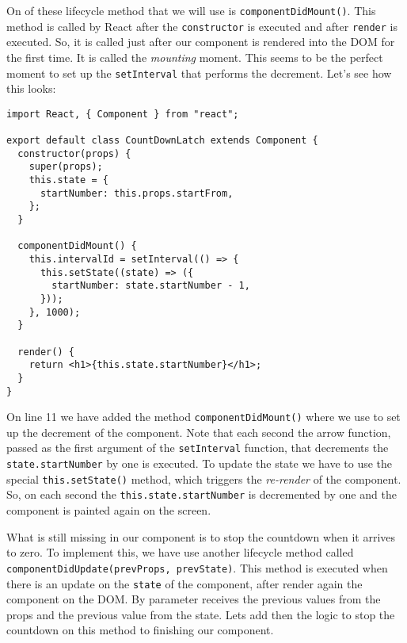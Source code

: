 \documentclass[a4paper, oneside, titlepage, 12pt]{book}
\begin{document}
On of these lifecycle method that we will use is \texttt{componentDidMount()}. This method is called by React after the \texttt{constructor} is executed and after \texttt{render} is executed. So, it is called just after our component is rendered into the DOM for the first time. It is called the \textit{mounting} moment. This seems to be the perfect moment to set up the \texttt{setInterval} that performs the decrement. Let's see how this looks:

\begin{verbatim}
import React, { Component } from "react";

export default class CountDownLatch extends Component {
  constructor(props) {
    super(props);
    this.state = {
      startNumber: this.props.startFrom,
    };
  }

  componentDidMount() {
    this.intervalId = setInterval(() => {
      this.setState((state) => ({
        startNumber: state.startNumber - 1,
      }));
    }, 1000);
  }
  
  render() {
    return <h1>{this.state.startNumber}</h1>;
  }
}
\end{verbatim}

On line 11 we have added the method \texttt{componentDidMount()} where we use to set up the decrement of the component. Note that each second the arrow function, passed as the first argument of the \texttt{setInterval} function, that decrements the \texttt{state.startNumber} by one is executed. To update the state we have to use the special \texttt{this.setState()} method, which triggers the \textit{re-render} of the component. So, on each second the \texttt{this.state.startNumber} is decremented by one and the component is painted again on the screen.
\newline

What is still missing in our component is to stop the countdown when it arrives to zero. To implement this, we have use another lifecycle method called \texttt{componentDidUpdate(prevProps, prevState)}. This method is executed when there is an update on the \texttt{state} of the component, after render again the component on the DOM. By  parameter receives the previous values from the props and the previous value from the state. Lets add then the logic to stop the countdown on this method to finishing our component.
\end{document}
